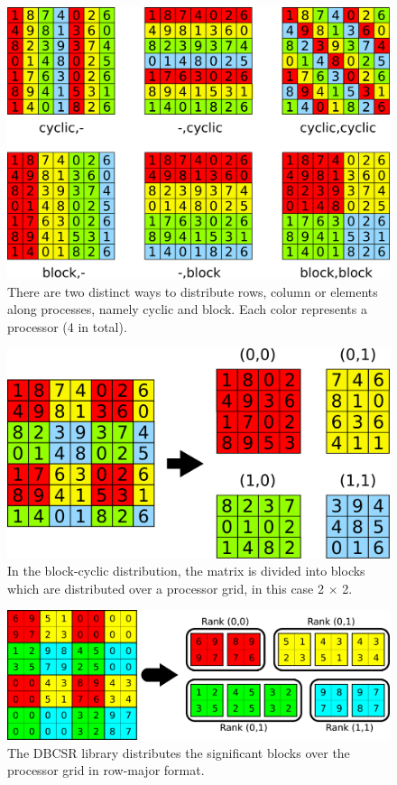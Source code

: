 \begin{figure}
\centering
\includegraphics[scale=0.25]{Pics/DISTSTOR1.pdf}
\caption{There are two distinct ways to distribute rows, column or elements along processes, namely cyclic and block. Each color represents a processor (4 in total).}
\label{fig:DISTSTOR1}
\end{figure}

\begin{figure}
\centering
\includegraphics[scale=0.25]{Pics/DISTSTOR2.pdf}
\caption{In the block-cyclic distribution, the matrix is divided into blocks which are distributed over a processor grid, in this case 2 $\times$ 2.}
\label{fig:DISTSTOR2}
\end{figure}

\begin{figure}
\centering
\includegraphics[scale=0.25]{Pics/DBCSR.pdf}
\caption{The DBCSR library distributes the significant blocks over the processor grid in row-major format.}
\label{fig:DISTSTOR2}
\end{figure}

